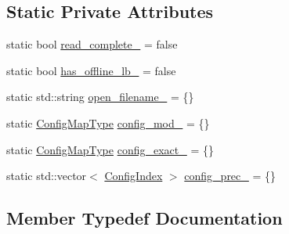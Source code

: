 \subsection*{Static Private Attributes}
\begin{DoxyCompactItemize}
\item 
static bool \hyperlink{structvt_1_1vrt_1_1collection_1_1balance_1_1_read_l_b_config_a1fcb6cf46a05f2b3bf3a3131f14310c0}{read\+\_\+complete\+\_\+} = false
\item 
static bool \hyperlink{structvt_1_1vrt_1_1collection_1_1balance_1_1_read_l_b_config_acb54cd90ac40853845cb5ee458fe2c12}{has\+\_\+offline\+\_\+lb\+\_\+} = false
\item 
static std\+::string \hyperlink{structvt_1_1vrt_1_1collection_1_1balance_1_1_read_l_b_config_ad312391a8868f40127765a236022979b}{open\+\_\+filename\+\_\+} = \{\}
\item 
static \hyperlink{structvt_1_1vrt_1_1collection_1_1balance_1_1_read_l_b_config_ad7babe539cf2171b9a9cee642b36a965}{Config\+Map\+Type} \hyperlink{structvt_1_1vrt_1_1collection_1_1balance_1_1_read_l_b_config_a7ba0036a147c6bb0a68d994ee727353f}{config\+\_\+mod\+\_\+} = \{\}
\item 
static \hyperlink{structvt_1_1vrt_1_1collection_1_1balance_1_1_read_l_b_config_ad7babe539cf2171b9a9cee642b36a965}{Config\+Map\+Type} \hyperlink{structvt_1_1vrt_1_1collection_1_1balance_1_1_read_l_b_config_af8edb18471dab4f0978fd3c5a03686d1}{config\+\_\+exact\+\_\+} = \{\}
\item 
static std\+::vector$<$ \hyperlink{namespacevt_1_1vrt_1_1collection_1_1balance_ac1bb9eee8129549177880dbb4e5f6a34}{Config\+Index} $>$ \hyperlink{structvt_1_1vrt_1_1collection_1_1balance_1_1_read_l_b_config_aa1772b9384bf1e0c7ee480c8d303b94f}{config\+\_\+prec\+\_\+} = \{\}
\end{DoxyCompactItemize}


\subsection{Member Typedef Documentation}
\mbox{\label{structvt_1_1vrt_1_1collection_1_1balance_1_1_read_l_b_config_ad7babe539cf2171b9a9cee642b36a965}} 
